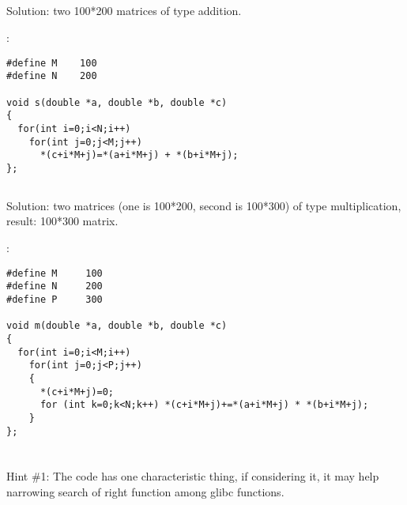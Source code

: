 \subsection{}

{Solution: two 100*200 matrices of \Tdouble type addition.}

:

\begin{lstlisting}
#define M    100
#define N    200

void s(double *a, double *b, double *c)
{
  for(int i=0;i<N;i++)
    for(int j=0;j<M;j++)
      *(c+i*M+j)=*(a+i*M+j) + *(b+i*M+j);
};
\end{lstlisting}

\subsection{}

{Solution: two matrices (one is 100*200, second is 100*300) of \Tdouble type multiplication, result: 100*300
matrix.}

:

\begin{lstlisting}
#define M     100
#define N     200
#define P     300

void m(double *a, double *b, double *c)
{
  for(int i=0;i<M;i++)
    for(int j=0;j<P;j++)
    {
      *(c+i*M+j)=0;
      for (int k=0;k<N;k++) *(c+i*M+j)+=*(a+i*M+j) * *(b+i*M+j);
    }
};
\end{lstlisting}

\section{}

\subsection{}

{Hint \#1: The code has one characteristic thing, if considering it, it may help narrowing search of right function 
among glibc functions}.

